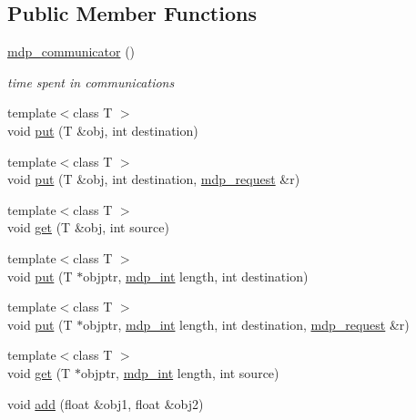 \subsection*{Public Member Functions}
\begin{DoxyCompactItemize}
\item 
\hyperlink{classmdp__communicator_a9c38d613d17973364b3121d8e8b03301}{mdp\+\_\+communicator} ()
\begin{DoxyCompactList}\small\item\em time spent in communications \end{DoxyCompactList}\item 
{\footnotesize template$<$class T $>$ }\\void \hyperlink{classmdp__communicator_a16cb893e7fdbf67e04f8f8b21ee7caff}{put} (T \&obj, int destination)
\item 
{\footnotesize template$<$class T $>$ }\\void \hyperlink{classmdp__communicator_a609cf23b630d037cc39d9cdd7c8fc165}{put} (T \&obj, int destination, \hyperlink{mdp__communicator_8h_ad8cbf5bc85a849902c39cd29d3f9a8f1}{mdp\+\_\+request} \&r)
\item 
{\footnotesize template$<$class T $>$ }\\void \hyperlink{classmdp__communicator_a137961f8fefcb8c06df8f58131469ee8}{get} (T \&obj, int source)
\item 
{\footnotesize template$<$class T $>$ }\\void \hyperlink{classmdp__communicator_a0e51d7eed859c17e2fde64087bec4449}{put} (T $\ast$objptr, \hyperlink{mdp__global__vars_8h_aaa1ad9d0dcd2124aa5af0120d9954174}{mdp\+\_\+int} length, int destination)
\item 
{\footnotesize template$<$class T $>$ }\\void \hyperlink{classmdp__communicator_a6ba5504485c001d1897cd66e4575e494}{put} (T $\ast$objptr, \hyperlink{mdp__global__vars_8h_aaa1ad9d0dcd2124aa5af0120d9954174}{mdp\+\_\+int} length, int destination, \hyperlink{mdp__communicator_8h_ad8cbf5bc85a849902c39cd29d3f9a8f1}{mdp\+\_\+request} \&r)
\item 
{\footnotesize template$<$class T $>$ }\\void \hyperlink{classmdp__communicator_ae977d9b2fe506a601bb8fc38ed09c571}{get} (T $\ast$objptr, \hyperlink{mdp__global__vars_8h_aaa1ad9d0dcd2124aa5af0120d9954174}{mdp\+\_\+int} length, int source)
\item 
void \hyperlink{classmdp__communicator_a59576e470c0eb7c0b5faa177cc90c54b}{add} (float \&obj1, float \&obj2)

\end{DoxyCompactItemize}
